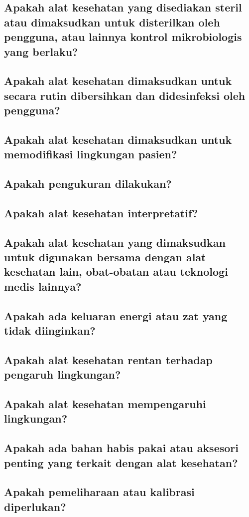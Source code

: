 \documentclass[11pt,a4paper,twoside,draft,onecolumn]{book}
\begin{document}
			\subsection{Apakah alat kesehatan yang disediakan steril atau dimaksudkan untuk disterilkan oleh pengguna, atau lainnya kontrol mikrobiologis yang berlaku?}
			\subsection{Apakah alat kesehatan dimaksudkan untuk secara rutin dibersihkan dan didesinfeksi oleh pengguna?}
			\subsection{Apakah alat kesehatan dimaksudkan untuk memodifikasi lingkungan pasien?}
			\subsection{Apakah pengukuran dilakukan?}
			\subsection{Apakah alat kesehatan interpretatif?}
			\subsection{Apakah alat kesehatan yang dimaksudkan untuk digunakan bersama dengan alat kesehatan lain, obat-obatan atau teknologi medis lainnya?}
			\subsection{Apakah ada keluaran energi atau zat yang tidak diinginkan?}
			\subsection{Apakah alat kesehatan rentan terhadap pengaruh lingkungan?}
			\subsection{Apakah alat kesehatan mempengaruhi lingkungan?}
			\subsection{Apakah ada bahan habis pakai atau aksesori penting yang terkait dengan alat kesehatan?}
			\subsection{Apakah pemeliharaan atau kalibrasi diperlukan?}
\end{document}
